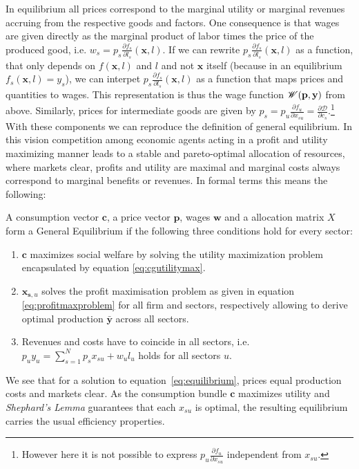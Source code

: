 In equilibrium all prices correspond to the marginal utility or marginal revenues accruing from the respective goods and factors. One consequence is that wages are given directly as the marginal product of labor times the price of the produced good, i.e. $w_{s} =  p_s \frac{\partial f_s}{\partial l_s}(\mathbf x, l) $.
If we can rewrite $ p_s \frac{\partial f_s}{\partial l_s}(\mathbf x, l) $ as a function, that only depends on $f(\mathbf x,l)$ and $l$ and not $\mathbf x$ itself (because in an equilibrium $f_s(\mathbf x,l) = y_s$), we can interpet $p_s \frac{\partial f_s}{\partial l_s}(\mathbf x, l)$ as a function that maps prices and quantities to wages.
This  representation is thus the wage function $\mathscr{W}(\mathbf{p},\mathbf{y})$ from above.
Similarly, prices for intermediate goods are given by $p_{s} =  p_u \frac{\partial f_u}{\partial x_{su}} = \frac{\partial \mathcal D}{\partial c_s}$.\footnote{However here it is not possible to express $p_u \frac{\partial f_u}{\partial x_{su}}$ independent from $x_{su}$.}
With these components we can reproduce the definition of general equilibrium. In this vision competition among economic agents acting in a profit and utility maximizing manner leads to a stable and pareto-optimal allocation of resources, where markets clear, profits and utility are maximal and marginal costs always correspond to marginal benefits or revenues.
In formal terms this means the following:

\begin{definition}
  A consumption vector $\mathbf c$, a price vector $\mathbf p$, wages $\mathbf w $ and a allocation matrix $ X$ form a General Equilibrium if the following three conditions hold for every sector:
  \begin{enumerate}
    \item $\mathbf c$ maximizes social welfare by solving the utility maximization problem encapsulated by equation \eqref{eq:cgutilitymax}.
        \item $ \mathbf{x}_{\mathbf{s},u }$ solves the profit maximisation problem as given in equation \eqref{eq:profitmaxproblem} for all firm and sectors, respectively allowing to derive optimal production $\bar {\mathbf{y}}$ across all sectors. 
    \item  Revenues and costs have to coincide in all sectors, i.e. 
$ p_u y_u = \sum_{s=1}^N p_s x_{su} +  w_u l_u$ holds for all sectors $u$.
  \end{enumerate}
\end{definition}
We see that for a solution to equation~\eqref{eq:equilibrium}, prices equal production costs and markets clear. As the consumption bundle $\mathbf c$ maximizes utility and \textit{Shephard's Lemma} guarantees that each $x_{su}$ is optimal, the resulting equilibrium carries the usual efficiency properties.

